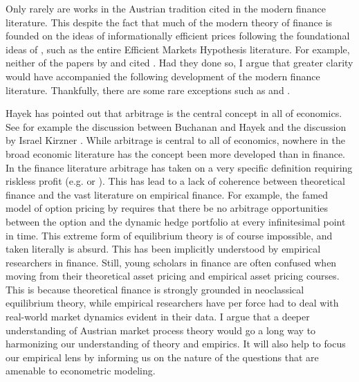 \documentclass[11pt,]{article}
\begin{document}
Only rarely are works in the Austrian tradition cited in the modern
finance literature. This despite the fact that much of the modern theory
of finance is founded on the ideas of informationally efficient prices
following the foundational ideas of \citet{Hayek1945}, such as the
entire Efficient Markets Hypothesis literature. For example, neither of
the papers by \citet{Samuelson1965} and \citet{Fama1970} cited
\citet{Hayek1945}. Had they done so, I argue that greater clarity would
have accompanied the following development of the modern finance
literature. Thankfully, there are some rare exceptions such as
\citet{Grossman1989} and \citet{Vives2010}.

Hayek has pointed out that arbitrage is the central concept in all of
economics. See for example the discussion between Buchanan and Hayek
\citep{BuchananHayek} and the discussion by Israel Kirzner
\citep{KirznerYT1}. While arbitrage is central to all of economics,
nowhere in the broad economic literature has the concept been more
developed than in finance. In the finance literature arbitrage has taken
on a very specific definition requiring riskless profit (e.g.
\citep{Varian1987} or \citep{DybvigRoss1989}). This has lead to a lack
of coherence between theoretical finance and the vast literature on
empirical finance. For example, the famed model of option pricing by
\citet{BlackScholes1973} requires that there be no arbitrage
opportunities between the option and the dynamic hedge portfolio at
every infinitesimal point in time. This extreme form of equilibrium
theory is of course impossible, and taken literally is absurd. This has
been implicitly understood by empirical researchers in finance. Still,
young scholars in finance are often confused when moving from their
theoretical asset pricing and empirical asset pricing courses. This is
because theoretical finance is strongly grounded in neoclassical
equilibrium theory, while empirical researchers have per force had to
deal with real-world market dynamics evident in their data. I argue that
a deeper understanding of Austrian market process theory would go a long
way to harmonizing our understanding of theory and empirics. It will
also help to focus our empirical lens by informing us on the nature of
the questions that are amenable to econometric modeling.
\end{document}

